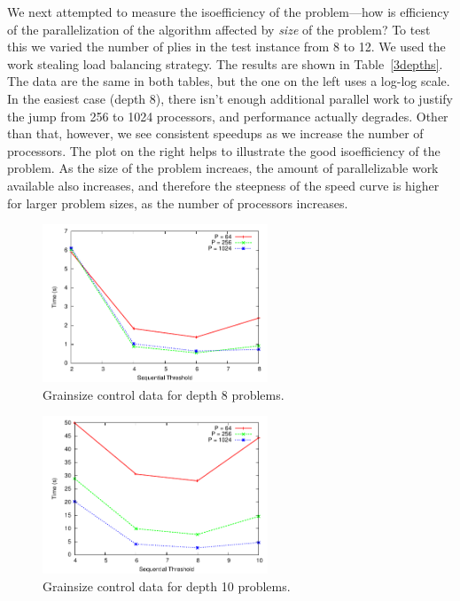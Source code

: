\documentclass[11pt]{article}
\begin{document}
We next attempted to measure the isoefficiency of the problem---how is efficiency of the parallelization of the
algorithm affected by {\em size} of the problem?  To test this we varied the number of plies in the test instance from
8 to 12. We used the work stealing load balancing strategy.  The results are shown in Table~\ref{3depths}.  The data are
the same in both tables, but the one on the left uses a log-log scale.  In the easiest case (depth 8), there isn't
enough additional parallel work to justify the jump from 256 to 1024 processors, and performance actually degrades.
Other than that, however, we see consistent speedups as we increase the number of processors.  The plot on the right helps to
illustrate the good isoefficiency of the problem.  As the size of the problem increaes, the amount of parallelizable
work available also increases, and therefore the steepness of the speed curve is higher for larger problem sizes, as the
number of processors increases.
 
\begin{figure}[h]
\centering
\includegraphics[width=0.6\textwidth]{plots/dep8.pdf}
\caption{Grainsize control data for depth 8 problems.}
\label{dep8}
\end{figure}
 
\begin{figure}[h]
\centering
\includegraphics[width=0.6\textwidth]{plots/dep10.pdf}
\caption{Grainsize control data for depth 10 problems.}
\label{dep10}
\end{figure}
 
\end{document}
